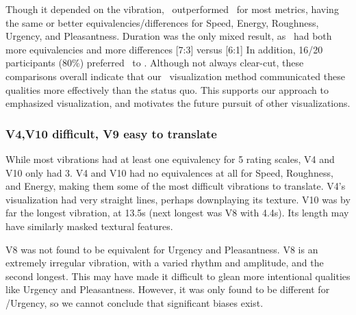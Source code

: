 	Though it depended on the vibration, \linear\ outperformed \original\ for most metrics, having the same or better equivalencies/differences for Speed, Energy, Roughness, Urgency, and Pleasantness.
	Duration was the only mixed result, as \original\ had both more equivalencies and more differences  [7:3] versus [6:1]
    In addition, 16/20 participants (80\%) preferred \linear\ to \original.
    Although not always clear-cut, these comparisons overall indicate that our \linear\ visualization method communicated these %
     qualities more effectively than the status quo.
    This supports our approach to emphasized visualization, and motivates the future pursuit of other visualizations.
    
    \subsubsection{V4,V10 difficult, V9 easy to translate}
    
    While most vibrations had at least one equivalency for 5 rating scales, V4 and V10 only had 3.
    V4 and V10 had no equivalences at all for Speed, Roughness, and Energy, making them some of the most difficult vibrations to translate.
    V4's visualization had very straight lines, perhaps downplaying its texture.
    V10 was by far the longest vibration, at 13.5s (next longest was V8 with 4.4s).
    Its length may have similarly masked textural features.
    
    V8 was not found to be equivalent for Urgency and Pleasantness.
    V8 is an extremely irregular vibration, with a varied rhythm and amplitude, and the second longest.
    This may have made it difficult to glean more intentional qualities like Urgency and Pleasantness.
    However, it was only found to be different for \original/Urgency, so we cannot conclude that significant biases exist.
    
